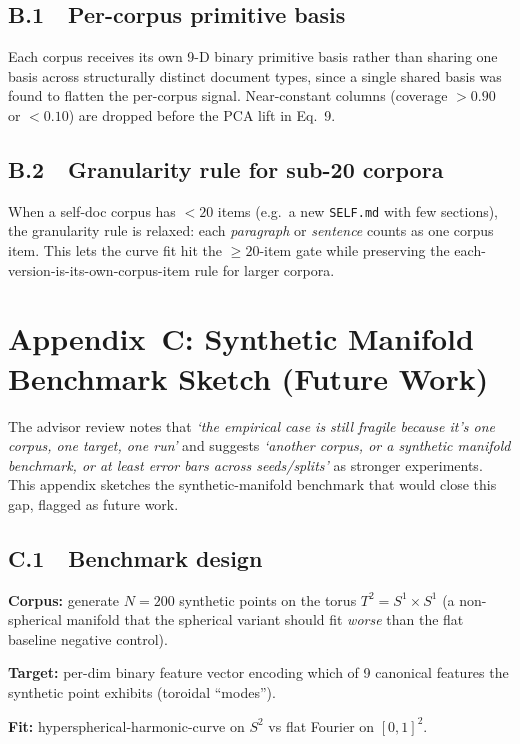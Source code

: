 \documentclass[11pt,a4paper]{article}
\begin{document}
\subsection{B.1~~Per-corpus primitive basis}

Each corpus receives its own 9-D binary primitive basis rather than sharing one basis across structurally distinct document types, since a single shared basis was found to flatten the per-corpus signal. Near-constant columns (coverage $> 0.90$ or $< 0.10$) are dropped before the PCA lift in Eq.~9.

\subsection{B.2~~Granularity rule for sub-20 corpora}

When a self-doc corpus has $< 20$ items (e.g.\ a new \texttt{SELF.md} with few sections), the granularity rule is relaxed: each \textit{paragraph} or \textit{sentence} counts as one corpus item. This lets the curve fit hit the $\geq 20$-item gate while preserving the each-version-is-its-own-corpus-item rule for larger corpora.

\section{Appendix~C: Synthetic Manifold Benchmark Sketch (Future Work)}

The advisor review notes that \textit{`the empirical case is still fragile because it's one corpus, one target, one run'} and suggests \textit{`another corpus, or a synthetic manifold benchmark, or at least error bars across seeds/splits'} as stronger experiments. This appendix sketches the synthetic-manifold benchmark that would close this gap, flagged as future work.

\subsection{C.1~~Benchmark design}

\textbf{Corpus:} generate $N = 200$ synthetic points on the torus $T^2 = S^1 \times S^1$ (a non-spherical manifold that the spherical variant should fit \textit{worse} than the flat baseline \textemdash{} negative control).

\textbf{Target:} per-dim binary feature vector encoding which of 9 canonical features the synthetic point exhibits (toroidal ``modes'').

\textbf{Fit:} hyperspherical-harmonic-curve on $S^2$ vs flat Fourier on $[0,1]^2$.
\end{document}
